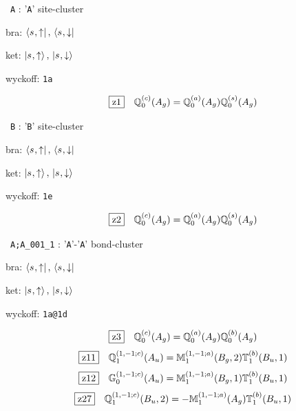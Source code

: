 \documentclass[fleqn,10pt,landscape]{jsarticle}
\begin{document}
\vspace{5mm}

\noindent\textbullet\, \texttt{A} : '\texttt{A}' site-cluster

\noindent\quad * bra: $\bra{s_{},\uparrow},\, \bra{s_{},\downarrow}$

\noindent\quad * ket: $\ket{s_{},\uparrow},\, \ket{s_{},\downarrow}$

\noindent\quad * wyckoff: \texttt{1a}

\begin{dmath*}
\hspace*{3mm}\fbox{z1}\quad \mathbb{Q}_{0}^{(c)}(A_{g})=\mathbb{Q}_{0}^{(a)}(A_{g}) \mathbb{Q}_{0}^{(s)}(A_{g})
\end{dmath*}
\vspace{5mm}

\noindent\textbullet\, \texttt{B} : '\texttt{B}' site-cluster

\noindent\quad * bra: $\bra{s_{},\uparrow},\, \bra{s_{},\downarrow}$

\noindent\quad * ket: $\ket{s_{},\uparrow},\, \ket{s_{},\downarrow}$

\noindent\quad * wyckoff: \texttt{1e}

\begin{dmath*}
\hspace*{3mm}\fbox{z2}\quad \mathbb{Q}_{0}^{(c)}(A_{g})=\mathbb{Q}_{0}^{(a)}(A_{g}) \mathbb{Q}_{0}^{(s)}(A_{g})
\end{dmath*}
\vspace{5mm}

\noindent\textbullet\, \texttt{A;A_001_1} : '\texttt{A}'-'\texttt{A}' bond-cluster

\noindent\quad * bra: $\bra{s_{},\uparrow},\, \bra{s_{},\downarrow}$

\noindent\quad * ket: $\ket{s_{},\uparrow},\, \ket{s_{},\downarrow}$

\noindent\quad * wyckoff: \texttt{1a@1d}

\begin{dmath*}
\hspace*{3mm}\fbox{z3}\quad \mathbb{Q}_{0}^{(c)}(A_{g})=\mathbb{Q}_{0}^{(a)}(A_{g}) \mathbb{Q}_{0}^{(b)}(A_{g})
\end{dmath*}
\begin{dmath*}
\hspace*{3mm}\fbox{z11}\quad \mathbb{Q}_{1}^{(1,-1;c)}(A_{u})=\mathbb{M}_{1}^{(1,-1;a)}(B_{g},2) \mathbb{T}_{1}^{(b)}(B_{u},1)
\end{dmath*}
\begin{dmath*}
\hspace*{3mm}\fbox{z12}\quad \mathbb{G}_{0}^{(1,-1;c)}(A_{u})=\mathbb{M}_{1}^{(1,-1;a)}(B_{g},1) \mathbb{T}_{1}^{(b)}(B_{u},1)
\end{dmath*}
\begin{dmath*}
\hspace*{3mm}\fbox{z27}\quad \mathbb{Q}_{1}^{(1,-1;c)}(B_{u},2)=- \mathbb{M}_{1}^{(1,-1;a)}(A_{g}) \mathbb{T}_{1}^{(b)}(B_{u},1)
\end{dmath*}
\vspace{5mm}
\end{document}

